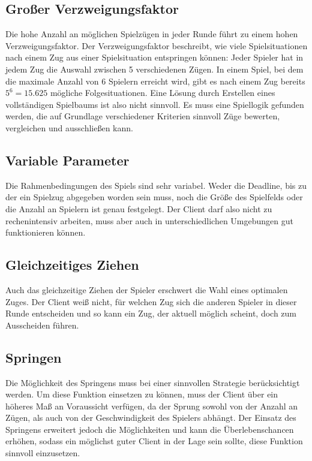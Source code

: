 \documentclass[12pt,a4paper]{article}
\begin{document}
\subsection{Großer Verzweigungsfaktor}
Die hohe Anzahl an möglichen Spielzügen in jeder Runde führt zu einem hohen Verzweigungsfaktor. Der Verzweigungsfaktor beschreibt, wie viele Spielsituationen nach einem Zug aus einer Spielsituation entspringen können: Jeder Spieler hat in jedem Zug die Auswahl zwischen 5 verschiedenen Zügen. In einem Spiel, bei dem die maximale Anzahl von 6 Spielern erreicht wird, gibt es nach einem Zug bereits $5^6 = 15.625$ mögliche Folgesituationen. Eine Lösung durch Erstellen eines vollständigen Spielbaums ist also nicht sinnvoll. Es muss eine Spiellogik gefunden werden, die auf Grundlage verschiedener Kriterien sinnvoll Züge bewerten, vergleichen und ausschließen kann.


\subsection{Variable Parameter}
Die Rahmenbedingungen des Spiels sind sehr variabel. Weder die Deadline, bis zu der ein Spielzug abgegeben worden sein muss, noch die Größe des Spielfelds oder die Anzahl an Spielern ist genau festgelegt. Der Client darf also nicht zu rechenintensiv arbeiten, muss aber auch in unterschiedlichen Umgebungen gut funktionieren können.

\subsection{Gleichzeitiges Ziehen}
Auch das gleichzeitige Ziehen der Spieler erschwert die Wahl eines optimalen Zuges. Der Client weiß nicht, für welchen Zug sich die anderen Spieler in dieser Runde entscheiden und so kann ein Zug, der aktuell möglich scheint, doch zum Ausscheiden führen.

\subsection{Springen}
Die Möglichkeit des Springens muss bei einer sinnvollen Strategie berücksichtigt werden. Um diese Funktion einsetzen zu können, muss der Client über ein höheres Maß an Voraussicht verfügen, da der Sprung sowohl von der Anzahl an Zügen, als auch von der Geschwindigkeit des Spielers abhängt. Der Einsatz des Springens erweitert jedoch die Möglichkeiten und kann die Überlebenschancen erhöhen, sodass ein möglichst guter Client in der Lage sein sollte, diese Funktion sinnvoll einzusetzen.
\end{document}
